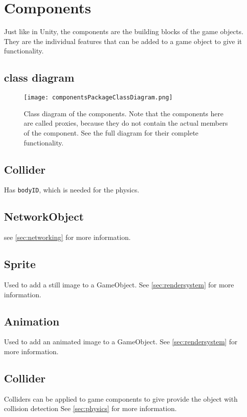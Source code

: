 \section{Components}
\label{sec:components}
Just like in Unity, the components are the building blocks of the game objects.
They are the individual features that can be added to a game object to give it functionality.

\subsection{class diagram}
\begin{figure}[H]
    \texttt{[image: componentsPackageClassDiagram.png]}
    \caption{Class diagram of the components. Note that the components here are called proxies, because they do not contain the actual members of the component. See the full diagram for their complete functionality.}
    \label{fig:components}
\end{figure}

\subsection{Collider}
Has \texttt{bodyID}, which is needed for the physics.

\subsection{NetworkObject}
see \autoref{sec:networking} for more information.

\subsection{Sprite}
Used to add a still image to a GameObject.
See \autoref{sec:rendersystem} for more information.

\subsection{Animation}
Used to add an animated image to a GameObject.
See \autoref{sec:rendersystem} for more information.

\subsection{Collider}
 Colliders can be applied to game components to give provide the object with collision detection
See \autoref{sec:physics} for more information.
